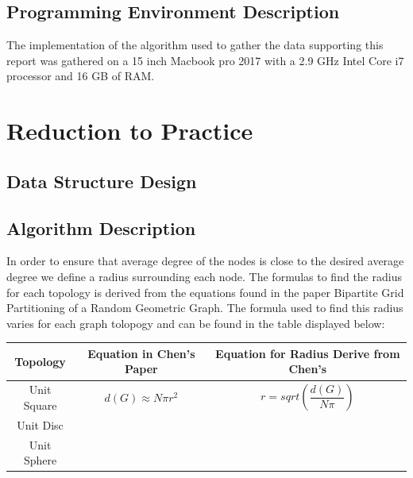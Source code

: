 \documentclass{article}
\begin{document}
  \subsection{Programming Environment Description}
  	The implementation of the algorithm used to gather the data supporting this report was gathered on a 15 inch Macbook pro 2017 with a 2.9 GHz Intel Core i7 processor and 16 GB of RAM.

  \section{Reduction to Practice}
	  \subsection{Data Structure Design}
	  \subsection{Algorithm Description}
  In order to ensure that average degree of the nodes is close to the desired average degree we define a radius surrounding each node.
  The formulas to find the radius for each topology is derived from the equations found in the paper Bipartite Grid Partitioning of a Random Geometric Graph\cite{chen2017bipartite}.
  The formula used to find this radius varies for each graph tolopogy and can be found in the table displayed below:

  \begin{tabular}{ |c|c|c| }
	  \hline
	  Topology & Equation in Chen's Paper & Equation for Radius Derive from Chen's \\
	  \hline
	  Unit Square & $d(G) \approx N\pi r^2 $ & $r = sqrt(\dfrac{d(G)}{N\pi})$ \\
	  \hline
	  Unit Disc   & & \\
	  \hline
	  Unit Sphere & & \\
	  \hline
  \end{tabular}
\end{document}
